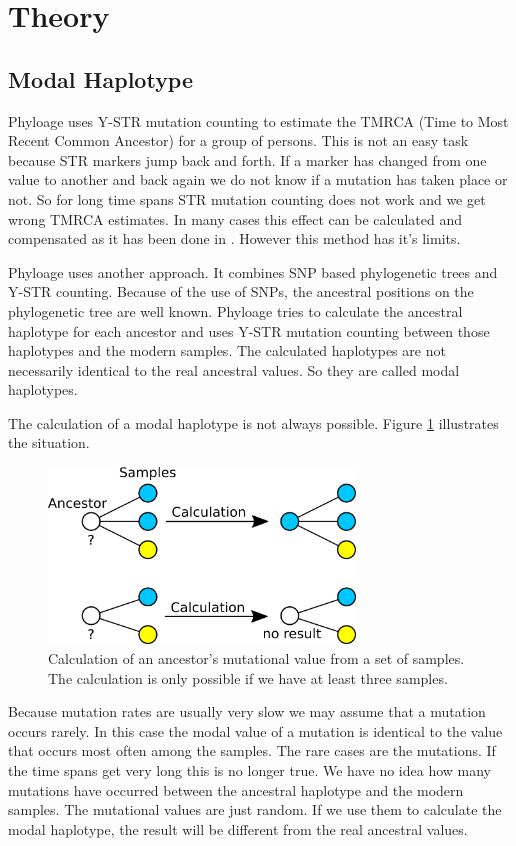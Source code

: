 \section{Theory}

\subsection{Modal Haplotype}

Phyloage uses Y-STR mutation counting to estimate the TMRCA
(Time to Most Recent Common Ancestor) for a group of persons.
This is not an easy task because STR markers jump back and
forth. If a marker has changed from one value to another and
back again we do not know if a mutation has taken place or
not. So for long time spans STR mutation counting does not
work and we get wrong TMRCA estimates. In many cases this
effect can be calculated and compensated as it has been done
in \cite{Kly09}. However this method has it's limits.

Phyloage uses another approach. It combines SNP based phylogenetic
trees and Y-STR counting. Because of the use of SNPs, the
ancestral positions on the phylogenetic tree are well known.
Phyloage tries to calculate the ancestral haplotype for each
ancestor and uses Y-STR mutation counting between those
haplotypes and the modern samples. The calculated haplotypes
are not necessarily identical to the real ancestral values.
So they are called modal haplotypes.

The calculation of a modal haplotype is not always possible.
Figure \ref{modal} illustrates the situation.

\begin{figure}[ht]
\centering
\includegraphics[width=8.14cm]{img/modal.png}
\caption{\label{modal} Calculation of an ancestor's mutational
value from a set of samples. The calculation is only possible
if we have at least three samples.}
\end{figure}

Because mutation rates are usually very slow we may assume
that a mutation occurs rarely. In this case the modal value
of a mutation is identical to the value that occurs most
often among the samples. The rare cases are the mutations.
If the time spans get very long this is no longer true. We
have no idea how many mutations have occurred between the
ancestral haplotype and the modern samples. The mutational
values are just random. If we use them to calculate the modal
haplotype, the result will be different from the real ancestral
values.

